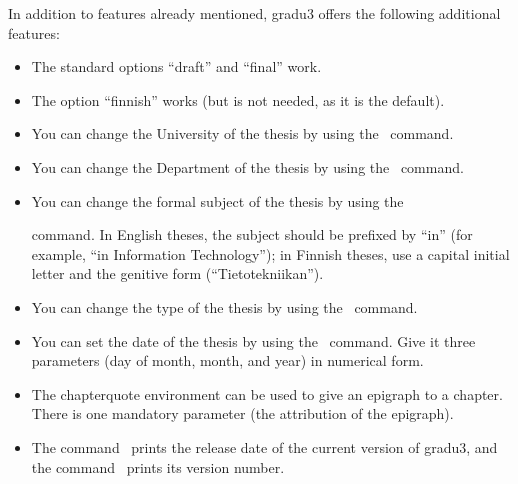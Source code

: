 \documentclass[utf8,bachelor,english]{gradu3}
\begin{document}
In addition to features already mentioned, gradu3 offers the following
additional features:
\begin{itemize}
\item The standard options ``draft'' and ``final''  work.
\item The option ``finnish'' works (but is not needed, as it is the default).
\item You can change the University of the thesis by using the
  \string\university\ command.
\item You can change the Department of the thesis by using the
  \string\department\ command.
\item You can change the formal subject of the thesis by using the
  \string\subject\ command.  In English theses, the subject should be
  prefixed by ``in'' (for example, ``in Information Technology''); in
  Finnish theses, use a capital initial letter and the genitive form
  (``Tietotekniikan'').
\item You can change the type of the thesis by using the \string\type\
  command.
\item You can set the date of the thesis by using the \string\setdate\
  command.  Give it three parameters (day of month, month, and year)
  in numerical form.
\item The chapterquote environment can be used to give an epigraph to
  a chapter.  There is one mandatory parameter (the attribution of the
  epigraph).
\item The command \string\graduclsdate\ prints the release date of the
  current version of gradu3, and the command \string\graduclsversion\
  prints its version number.
\end{itemize}
\end{document}
